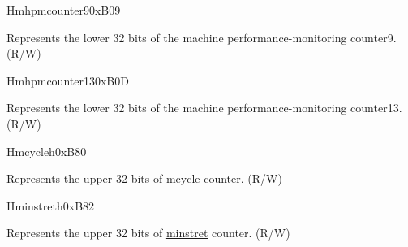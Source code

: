 \begin{register}{H}{mhpmcounter9}{0xB09}\label{regdesc:MHPMCOUNTER9}
%
\regnewline%
\begin{regdesc}\begin{reglist}
\label{fielddesc:MHPMCOUNTER9}\item [MHPMCOUNTER9] Represents the lower 32 bits of the machine performance-monitoring counter9. (R/W)
\end{reglist}\end{regdesc}
\end{register}

\begin{register}{H}{mhpmcounter13}{0xB0D}\label{regdesc:MHPMCOUNTER13}
%
\regnewline%
\begin{regdesc}\begin{reglist}
\label{fielddesc:MHPMCOUNTER13}\item [MHPMCOUNTER13] Represents the lower 32 bits of the machine performance-monitoring counter13. (R/W)
\end{reglist}\end{regdesc}
\end{register}

\begin{register}{H}{mcycleh}{0xB80}\label{regdesc:MCYCLEH}
%
\regnewline%
\begin{regdesc}\begin{reglist}
\label{fielddesc:MCYCLEH}\item [MCYCLEH] Represents the upper 32 bits of \hyperref[regdesc:MCYCLE]{mcycle} counter. (R/W)
\end{reglist}\end{regdesc}
\end{register}

\begin{register}{H}{minstreth}{0xB82}\label{regdesc:MINSTRETH}
%
\regnewline%
\begin{regdesc}\begin{reglist}
\label{fielddesc:MINSTRETH}\item [MINSTRETH] Represents the upper 32 bits of \hyperref[regdesc:MINSTRET]{minstret} counter. (R/W)
\end{reglist}\end{regdesc}
\end{register}

